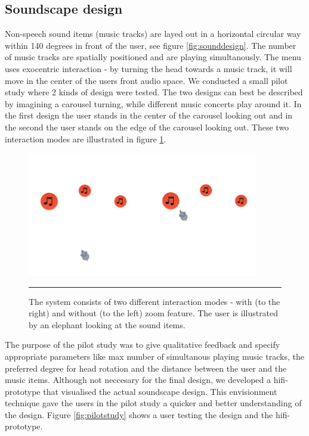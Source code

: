 \subsection{Soundscape design}
\label{sec:designsoundscape}
Non-speech sound items (music tracks) are layed out in a horizontal circular way within 140 degrees in front of the user, see figure \ref{fig:sounddesign}. The number of music tracks are spatially positioned and are playing simultanously. The menu uses exocentric interaction - by turning the head towards a music track, it will move in the center of the users front audio space. We conducted a small pilot study where 2 kinds of design were tested. The two designs can best be described by imagining a carousel turning, while different music concerts play around it. In the first design the user stands in the center of the carousel looking out and in the second the user stands on the edge of the carousel looking out. These two interaction modes are illustrated in figure \ref{fig:interactionmodes}.

\begin{figure}[t]
	\centering
		\includegraphics[width=0.9\textwidth,height=\textheight,keepaspectratio]{./Figures/interactionmodes.png}
		\rule{35em}{0.5pt}
	\caption[Interaction modes]{The system consists of two different interaction modes - with (to the right) and without (to the left) zoom feature. The user is illustrated by an elephant looking at the sound items.}
	\label{fig:interactionmodes}
\end{figure}

The purpose of the pilot study was to give qualitative feedback and specify appropriate parameters like max number of simultanous playing music tracks, the preferred degree for head rotation and the distance between the user and the music items. Although not neccesary for the final design, we developed a hifi-prototype \cite{benyon_designing_2010} that visualised the actual soundscape design. This envisionment technique gave the users in the pilot study a quicker and better understanding of the design. Figure \ref{fig:pilotstudy} shows a user testing the design and the hifi-prototype.

